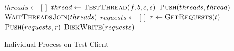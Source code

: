 \begin{algorithm}[ht!]
	\begin{algorithmic}
		\State $threads\gets[]$
		\State $thread\gets\Call{TestThread}{f,b,c,s}$
		\State $\Call{Push}{threads, thread}$
		\EndFor
		\State $\Call{WaitThreadsJoin}{threads}$
		\State $requests\gets[]$
		\State $r\gets\Call{GetRequests}{t}$
		\State $\Call{Push}{requests, r}$
		\EndFor
		\State $\Call{DiskWrite}{requests}$
		\EndProcedure
	\end{algorithmic}
	\caption{Individual Process on Test Client}
	\label{algo:testClientProcess}
\end{algorithm}
